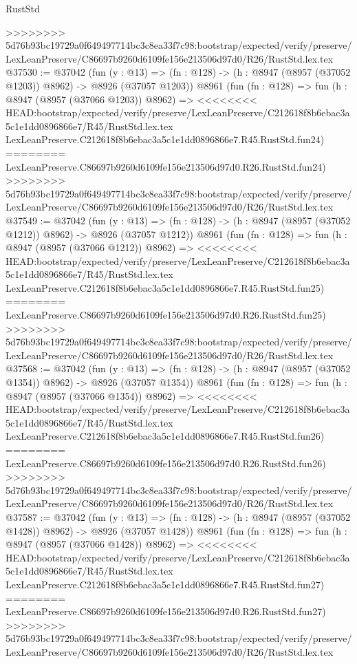 \begin{lexlean}{RustStd}
\begin{coremodule}
{\begin{coremodule}
{{{{{{{{{{{{{{{{{{{{{{{{{{{{{{{{{{{{{{{>>>>>>>> 5d76b93bc19729a0f649497714bc3c8ea33f7c98:bootstrap/expected/verify/preserve/LexLeanPreserve/C86697b9260d6109fe156e213506d97d0/R26/RustStd.lex.tex
@37530 := @37042
    (fun (y : @13) =>
    (fn : @128) -> (h : @8947 (@8957 (@37052 @1203)) @8962) -> @8926 (@37057 @1203))
    @8961
    (fun (fn : @128) =>
    fun (h : @8947 (@8957 (@37066 @1203)) @8962) =>
<<<<<<<< HEAD:bootstrap/expected/verify/preserve/LexLeanPreserve/C212618f8b6ebac3a5c1e1dd0896866e7/R45/RustStd.lex.tex
    LexLeanPreserve.C212618f8b6ebac3a5c1e1dd0896866e7.R45.RustStd.fun24)
========
    LexLeanPreserve.C86697b9260d6109fe156e213506d97d0.R26.RustStd.fun24)
>>>>>>>> 5d76b93bc19729a0f649497714bc3c8ea33f7c98:bootstrap/expected/verify/preserve/LexLeanPreserve/C86697b9260d6109fe156e213506d97d0/R26/RustStd.lex.tex
@37549 := @37042
    (fun (y : @13) =>
    (fn : @128) -> (h : @8947 (@8957 (@37052 @1212)) @8962) -> @8926 (@37057 @1212))
    @8961
    (fun (fn : @128) =>
    fun (h : @8947 (@8957 (@37066 @1212)) @8962) =>
<<<<<<<< HEAD:bootstrap/expected/verify/preserve/LexLeanPreserve/C212618f8b6ebac3a5c1e1dd0896866e7/R45/RustStd.lex.tex
    LexLeanPreserve.C212618f8b6ebac3a5c1e1dd0896866e7.R45.RustStd.fun25)
========
    LexLeanPreserve.C86697b9260d6109fe156e213506d97d0.R26.RustStd.fun25)
>>>>>>>> 5d76b93bc19729a0f649497714bc3c8ea33f7c98:bootstrap/expected/verify/preserve/LexLeanPreserve/C86697b9260d6109fe156e213506d97d0/R26/RustStd.lex.tex
@37568 := @37042
    (fun (y : @13) =>
    (fn : @128) -> (h : @8947 (@8957 (@37052 @1354)) @8962) -> @8926 (@37057 @1354))
    @8961
    (fun (fn : @128) =>
    fun (h : @8947 (@8957 (@37066 @1354)) @8962) =>
<<<<<<<< HEAD:bootstrap/expected/verify/preserve/LexLeanPreserve/C212618f8b6ebac3a5c1e1dd0896866e7/R45/RustStd.lex.tex
    LexLeanPreserve.C212618f8b6ebac3a5c1e1dd0896866e7.R45.RustStd.fun26)
========
    LexLeanPreserve.C86697b9260d6109fe156e213506d97d0.R26.RustStd.fun26)
>>>>>>>> 5d76b93bc19729a0f649497714bc3c8ea33f7c98:bootstrap/expected/verify/preserve/LexLeanPreserve/C86697b9260d6109fe156e213506d97d0/R26/RustStd.lex.tex
@37587 := @37042
    (fun (y : @13) =>
    (fn : @128) -> (h : @8947 (@8957 (@37052 @1428)) @8962) -> @8926 (@37057 @1428))
    @8961
    (fun (fn : @128) =>
    fun (h : @8947 (@8957 (@37066 @1428)) @8962) =>
<<<<<<<< HEAD:bootstrap/expected/verify/preserve/LexLeanPreserve/C212618f8b6ebac3a5c1e1dd0896866e7/R45/RustStd.lex.tex
    LexLeanPreserve.C212618f8b6ebac3a5c1e1dd0896866e7.R45.RustStd.fun27)
========
    LexLeanPreserve.C86697b9260d6109fe156e213506d97d0.R26.RustStd.fun27)
>>>>>>>> 5d76b93bc19729a0f649497714bc3c8ea33f7c98:bootstrap/expected/verify/preserve/LexLeanPreserve/C86697b9260d6109fe156e213506d97d0/R26/RustStd.lex.tex
}}}}}}}}}}}}}}}}}}}}}}}}}}}}}}}}}}}}}}}
\end{coremodule}}
\end{coremodule}
\end{lexlean}
